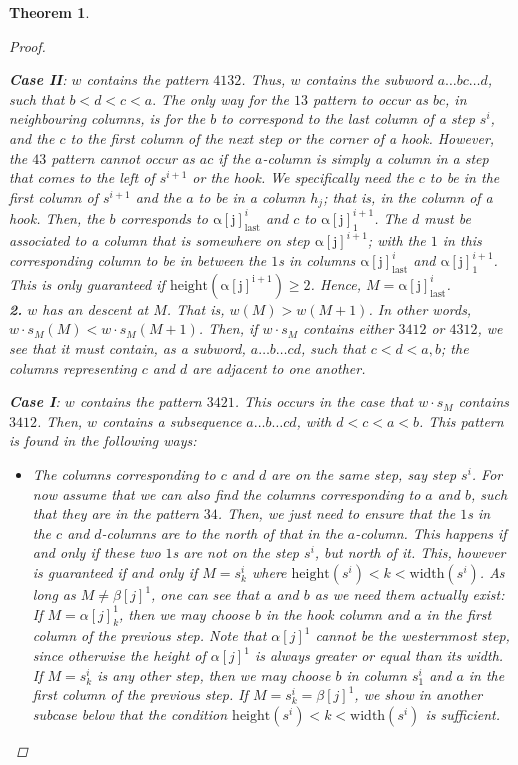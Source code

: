 \documentclass[11pt]{amsart}
\newtheorem{theorem}{Theorem}[section]
\theoremstyle{definition}
\theoremstyle{definition}
\theoremstyle{definition}
\theoremstyle{definition}
\begin{document}
\begin{theorem}
\begin{proof}
\begin{itemize}
    \end{itemize}
   \noindent \textbf{Case II}: $w$ contains the pattern $4132$. Thus, $w$ contains the subword $a\ldots bc \ldots d$, such that $b<d<c<a.$ The only way for the $13$ pattern to occur as $bc$, in neighbouring columns, is for the $b$ to correspond to the last column of a step $s^i$, and the $c$ to the first column of the next step or the corner of a hook. However, the $43$ pattern cannot occur as $ac$ if the $a$-column is simply a column in a step that comes to the left of $s^{i+1}$ or the hook. We specifically need the $c$ to be in the first column of $s^{i+1}$ and the $a$ to be in a column $h_j$; that is, in the column of a hook. Then, the $b$ corresponds to $\mathrm{\alpha[j]}^i_{\mathrm{last}}$ and $c$ to $\mathrm{\alpha[j]}^{i+1}_1$. The $d$ must be associated to a column that is somewhere on step $\mathrm{\alpha[j]}^{i+1}$; with the $1$ in this corresponding column to be in between the $1$s in columns $\mathrm{\alpha[j]}^i_{\mathrm{last}}$ and $\mathrm{\alpha[j]}^{i+1}_1$. This is only guaranteed if $\mathrm{height}(\mathrm{\alpha[j]^{i+1}})\geq 2$. Hence, $M=\mathrm{\alpha[j]}^i_{\mathrm{last}}$.\\

    \noindent \textbf{2.} $w$ has an descent at $M$. That is, $w(M) > w(M+1)$. In other words, $w\cdot s_M(M) < w\cdot s_M(M+1)$. Then, if $w\cdot s_M$ contains either $3412$ or $4312$, we see that it must contain, as a subword, $a\ldots b\ldots cd$, such that $c<d<a,b$; the columns representing $c$ and $d$ are adjacent to one another. 

    \noindent \textbf{Case I}: $w$ contains the pattern $3421$. This occurs in the case that $w\cdot s_M$ contains $3412$. Then, $w$ contains a subsequence $a\ldots b\ldots cd$, with $d<c<a<b$. This pattern is found in the following ways:
    \begin{itemize}
    \item
    The columns corresponding to $c$ and $d$ are on the same step, say step $s^i$. For now assume that we can also find the 
     columns corresponding to $a$ and $b$, such that they are in the pattern $34$.
    Then, we just need to ensure that the $1$s in the $c$ and $d$-columns are to the north of that in the $a$-column. This happens if and only if these two $1$s are not on the step $s^i$, but north of it. This, however is guaranteed if and only if $M=s_k^i$ where $\mathrm{height}(s^i) < k < \mathrm{width}(s^i)$. As long as $M \neq \beta[j]^1$, one can see that $a$ and $b$ as we need them actually exist: If $M = \alpha[j]^1_k$, then we may choose $b$ in the hook column and $a$ in the first column of the previous step. Note that $\alpha[j]^1$ cannot be the westernmost step, since otherwise the height of $\alpha[j]^1$ is always greater or equal than its width. If $M = s^i_k$ is any other step, then we may choose $b$ in column $s^i_1$ and $a$ in the first column of the previous step.
    If $M=s^i_k =\beta[j]^1$, we show in another subcase below that the condition $\mathrm{height}(s^i) < k < \mathrm{width}(s^i)$ is sufficient.
    

\end{itemize}
\end{proof}
\end{theorem}
\end{document}
